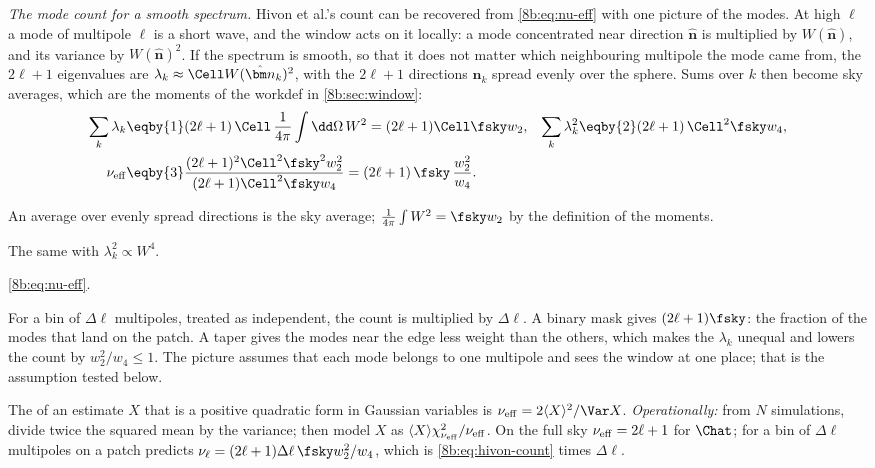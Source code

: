 \emph{The mode count for a smooth spectrum.} Hivon et al.'s count can be recovered from
\eqref{8b:eq:nu-eff} with one picture of the modes. At high $\ell$ a mode of multipole $\ell$ is a short
wave, and the window acts on it locally: a mode concentrated near direction $\hat{\bm n}$ is multiplied by
$W(\hat{\bm n})$, and its variance by $W(\hat{\bm n})^2$. If the spectrum is smooth, so that it does not matter which
neighbouring multipole the mode came from, the $2\ell+1$ eigenvalues are $\lambda_k\approx\Cell W(\hat{\bm n}_k)^2$, with the
$2\ell+1$ directions $\hat{\bm n}_k$ spread evenly over the sphere. Sums over $k$ then become sky averages, which
are the moments of the workdef in \cref{8b:sec:window}:
\begin{align}
  \sum_k\lambda_k&\eqby{1}(2\ell+1)\,\Cell\,\frac1{4\pi}\int\dd\Omega\,W^2=(2\ell+1)\Cell\fsky w_2,&
  \sum_k\lambda_k^2&\eqby{2}(2\ell+1)\,\Cell^2\fsky w_4,
  \nonumber\\
  \nu_{\rm eff}&\eqby{3}\frac{(2\ell+1)^2\Cell^2\fsky^2w_2^2}{(2\ell+1)\Cell^2\fsky w_4}=(2\ell+1)\,\fsky\,\frac{w_2^2}{w_4} .
  \label{8b:eq:hivon-count}
\end{align}
\begin{explain}
  \item An average over evenly spread directions is the sky average; $\frac1{4\pi}\int W^2=\fsky w_2$ by the
        definition of the moments.
  \item The same with $\lambda_k^2\propto W^4$.
  \item \eqref{8b:eq:nu-eff}.
\end{explain}
For a bin of $\Delta\ell$ multipoles, treated as independent, the count is multiplied by $\Delta\ell$. A binary mask
gives $(2\ell+1)\fsky$: the fraction of the modes that land on the patch. A taper gives the modes near
the edge less weight than the others, which makes the $\lambda_k$ unequal and lowers the count by $w_2^2/w_4\le1$.
The picture assumes that each mode belongs to one multipole and sees the window at one place; that
is the assumption tested below.

\begin{workdef}
The  of an estimate $X$ that is a positive quadratic form in
Gaussian variables is $\nu_{\rm eff}=2\langle X\rangle^2/\Var X$. \emph{Operationally:} from $N$ simulations,
divide twice the squared mean by the variance; then model $X$ as $\langle X\rangle\chi^2_{\nu_{\rm eff}}/\nu_{\rm eff}$.
On the full sky $\nu_{\rm eff}=2\ell+1$ for $\Chat$; for a bin of $\Delta\ell$ multipoles on a patch
 predicts $\nu_\ell=(2\ell+1)\Delta\ell\,\fsky w_2^2/w_4$, which is \eqref{8b:eq:hivon-count} times $\Delta\ell$.
\end{workdef}

